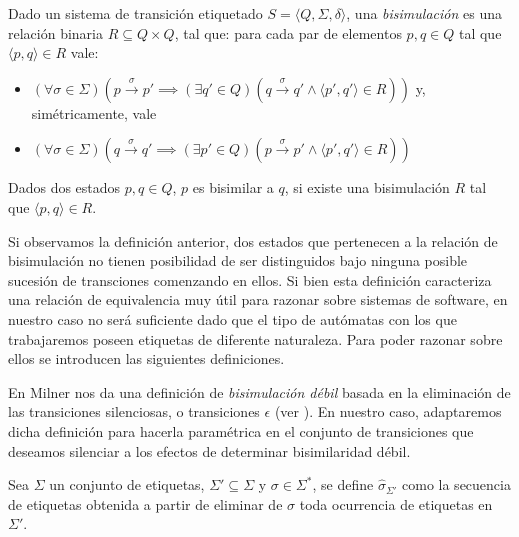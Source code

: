 \begin{definition} Dado un sistema de transición etiquetado $ S = \langle Q, \Sigma, \delta \rangle $, una \emph{bisimulación} es una relación binaria $R \subseteq Q \times Q$, tal que: para cada par de elementos $p, q \in Q$ tal que $\langle p, q \rangle \in R$ vale:
\begin{itemize}
    \item $(\forall \sigma \in \Sigma)(p \xrightarrow{\sigma} p' \implies (\exists q' \in Q)(q \xrightarrow{\sigma} q' \land \langle p', q' \rangle \in R))$ y, simétricamente, vale 
    \item $(\forall \sigma \in \Sigma)(q \xrightarrow{\sigma} q' \implies (\exists p' \in Q)(p \xrightarrow{\sigma} p' \land \langle p', q' \rangle \in R))$
\end{itemize}
Dados dos estados $p, q \in Q $, $p$ es bisimilar a $q$, si existe una bisimulación $R$ tal que $\langle p, q \rangle \in R$.
\end{definition}

Si observamos la definición anterior, dos estados que pertenecen a la relación de bisimulación no tienen posibilidad de ser distinguidos bajo ninguna posible sucesión de transciones comenzando en ellos. Si bien esta definición caracteriza una relación de equivalencia muy útil para razonar sobre sistemas de software, en nuestro caso no será suficiente dado que el tipo de autómatas con los que trabajaremos poseen etiquetas de diferente naturaleza. Para poder razonar sobre ellos se introducen las siguientes definiciones.

En \cite[Sec.~5.1, Def.~5]{milner89} Milner nos da una definición de \emph{bisimulación débil} basada en la eliminación de las transiciones silenciosas, o transiciones $\epsilon$ (ver \cite[Defs.~1 a~4]{milner89}). En nuestro caso, adaptaremos dicha definición para hacerla paramétrica en el conjunto de transiciones que deseamos silenciar a los efectos de determinar bisimilaridad débil.

\begin{definition}
Sea $\Sigma$ un conjunto de etiquetas, $\Sigma' \subseteq \Sigma$ y $\sigma \in \Sigma^*$, se define $\widehat{\sigma}_{\Sigma'}$ como la secuencia de etiquetas obtenida a partir de eliminar de $\sigma$ toda ocurrencia de etiquetas en $\Sigma'$.
\end{definition}

